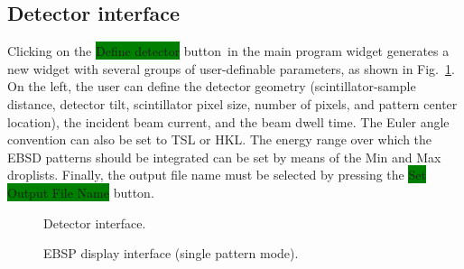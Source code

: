 \documentclass[DIV=calc, paper=letter, fontsize=11pt]{scrartcl}	 %
\newcommand{\button}[1]{\colorbox{green}{\textsf{#1}} button}
\begin{document}
\subsection{Detector interface\label{sec:idldetector}}
Clicking on the \button{Define detector}\ in the main program widget generates a new widget with several groups of user-definable parameters, as
shown in Fig.~\ref{fig:detector}.
On the left, the user can define the detector geometry (scintillator-sample distance, detector tilt, scintillator pixel size, number of pixels, and pattern
center location), the incident beam current, and the beam dwell time.  The Euler angle convention can also be set to TSL or HKL.  The energy range 
over which the EBSD patterns should be integrated can be set by means of the Min and Max droplists.  Finally, the output file name must be selected by 
pressing the \button{Set Output File Name}.

\begin{figure}[t]
\leavevmode\centering
\epsfxsize=4in
\caption{\label{fig:detector}Detector interface.}
\end{figure}

\begin{figure}[t]
\leavevmode\centering
\epsfxsize=3in
\caption{\label{fig:EBSP}EBSP display interface (single pattern mode).}
\end{figure}
\end{document}
